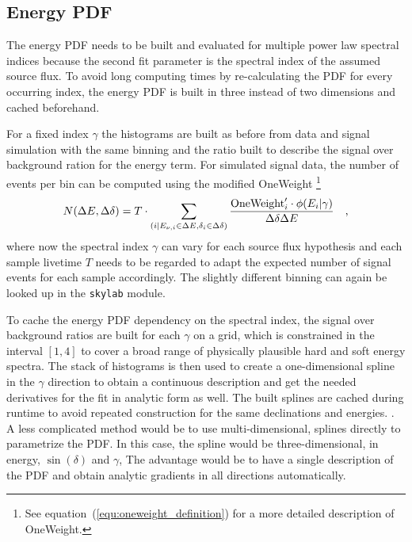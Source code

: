 \subsection*{Energy PDF}
The energy PDF needs to be built and evaluated for multiple power law spectral indices because the second fit parameter is the spectral index of the assumed source flux.
To avoid long computing times by re-calculating the PDF for every occurring index, the energy PDF is built in three instead of two dimensions and cached beforehand.

For a fixed index $\gamma$ the histograms are built as before from data and signal simulation with the same binning and the ratio built to describe the signal over background ration for the energy term.
For simulated signal data, the number of events per bin can be computed using the modified OneWeight \footnote{See equation~(\ref{equ:oneweight_definition}) for a more detailed description of OneWeight.}
\begin{equation}
  N(\Delta E, \Delta\delta)
  = T\cdot \sum_{(i|E_{\nu,i}\in\Delta E, \delta_i\in\Delta\delta)}
    \frac{\text{OneWeight}'_i \cdot \phi(E_i|\gamma)}{\Delta\delta \Delta E}
  \quad\text{,}
\end{equation}
where now the spectral index $\gamma$ can vary for each source flux hypothesis and each sample livetime $T$ needs to be regarded to adapt the expected number of signal events for each sample accordingly.
The slightly different binning can again be looked up in the \lstinline!skylab! module.

To cache the energy PDF dependency on the spectral index, the signal over background ratios are built for each $\gamma$ on a grid, which is constrained in the interval $[1, 4]$ to cover a broad range of physically plausible hard and soft energy spectra.
The stack of histograms is then used to create a one-dimensional spline in the $\gamma$ direction to obtain a continuous description and get the needed derivatives for the fit in analytic form as well.
The built splines are cached during runtime to avoid repeated construction for the same declinations and energies.
.
A less complicated method would be to use multi-dimensional, splines directly to parametrize the PDF.
In this case, the spline would be three-dimensional, in energy, $\sin(\delta)$ and $\gamma$,
The advantage would be to have a single description of the PDF and obtain analytic gradients in all directions automatically.


